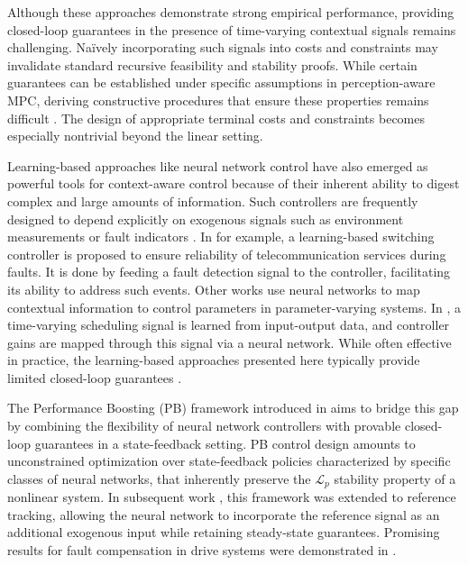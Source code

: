 \documentclass[journal,twoside,web]{ieeecolor}
\begin{document}
Although these approaches demonstrate strong empirical performance, providing closed-loop guarantees in the presence of time-varying contextual signals remains challenging. Naïvely incorporating such signals into costs and constraints may invalidate standard recursive feasibility and stability proofs. While certain guarantees can be established under specific assumptions in perception-aware MPC, deriving constructive procedures that ensure these properties remains difficult \cite{bonzanini2024perception}. The design of appropriate terminal costs and constraints becomes especially nontrivial beyond the linear setting.


Learning-based approaches like neural network control have also emerged as powerful tools for context-aware control because of their inherent ability to digest complex and large amounts of information. Such controllers are frequently designed to depend explicitly on exogenous signals such as environment measurements \cite{zimmerman2014neural,bahabri2025artificial} or fault indicators \cite{yen2000intelligent}. In \cite{huang2020learning} for example, a learning-based switching controller is proposed to ensure reliability of telecommunication services during faults. It is done by feeding a fault detection signal to the controller, facilitating its ability to address such events. Other works use neural networks to map contextual information to control parameters in parameter-varying systems. In \cite{kon2023directlearningparametervaryingfeedforward}, a time-varying scheduling signal is learned from input-output data, and controller gains are mapped through this signal via a neural network. While often effective in practice, the learning-based approaches presented here typically provide limited closed-loop guarantees \cite{zhang2022neural}.

The Performance Boosting (PB) framework introduced in \cite{10633771} aims to bridge this gap by combining the flexibility of neural network controllers with provable closed-loop guarantees in a state-feedback setting. PB control design amounts to unconstrained optimization over state-feedback policies characterized by specific classes of neural networks, that inherently preserve the $\mathcal{L}_p$ stability property of a nonlinear system. In subsequent work \cite{11312988}, this framework was extended to reference tracking, allowing the neural network to incorporate the reference signal as an additional exogenous input while retaining steady-state guarantees. Promising results for fault compensation in drive systems were demonstrated in \cite{kirsch2025resilient}.
\end{document}
